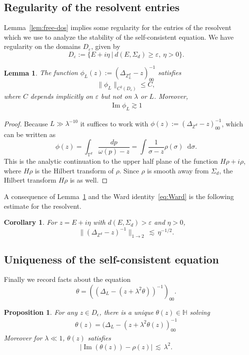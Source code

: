 \documentclass[11pt]{amsart}
\def\bbH{{\mathbb H}}
\def\bbZ{{\mathbb Z}}
\def\Torus{{\mathbb T}}
\def\eps{{\varepsilon}}
\newcommand{\diff}{\mathop{}\!\mathrm{d}}
\newcommand{\Impt}{\operatorname*{Im}}
\def\lsim{{\,\lesssim\,}}
\numberwithin{equation}{section}
\numberwithin{theorem}{section}
\newtheorem{lemma}[theorem]{Lemma}
\newtheorem{corollary}[theorem]{Corollary}
\newtheorem{proposition}[theorem]{Proposition}
\begin{document}
\subsection{Regularity of the resolvent entries}

Lemma~\ref{lem:free-dos} implies some regularity for the entries of the resolvent which we use
to analyze the stability of the self-consistent equation. We have regularity on
the domains $D_\eps$, given by
$$D_{\eps} := \{E+i\eta\ |\ d(E,\Sigma_d)\geq\eps,\ \eta>0 \}.$$
\begin{lemma}
\label{lem:dos-regularity}
The function $\phi_L(z) := (\Delta_{\bbZ^d_L}-z)^{-1}_{00}$ satisfies
\[
\|\phi_L\|_{C^2(D_\eps)} \leq C,
\]
where $C$ depends implicitly on $\eps$ but not on $\lambda$ or $L$.
Moreover,
\begin{align}\label{eq:diagonalResolventLowerBound}
	\Impt\phi_L\gtrsim 1
\end{align}
\end{lemma}
\begin{proof}
Because $L\gg \lambda^{-10}$ it suffices to work with $\phi(z) := (\Delta_{\bbZ^d}-z)^{-1}_{00}$, which can be written as
\[
\phi(z) = \int_{\Torus^d} \frac{dp}{\omega(p)-z}
= \int \frac{1}{\sigma-z} \rho(\sigma)\diff \sigma.
\]
This is the analytic continuation to the upper half plane of the function $H\rho + i\rho$, where
$H\rho$ is the Hilbert transform of $\rho$.  Since $\rho$ is smooth away from $\Sigma_d$,
the Hilbert transform $H\rho$ is as well.
\end{proof}

A consequence of Lemma~\ref{lem:dos-regularity} and the Ward identity~\eqref{eq:Ward} is the following estimate for the resolvent.
\begin{corollary}
\label{cor:free-onetwo}
For $z=E+i\eta$ with $d(E,\Sigma_d)>\eps$ and $\eta>0$,
\[
\|(\Delta_{\bbZ^d} - z)^{-1}\|_{1\to 2} \lsim \eta^{-1/2}.
\]
\end{corollary}

\subsection{Uniqueness of the self-consistent equation}
Finally we record facts about the equation
\[
\theta = ((\Delta_L - (z+\lambda^2\theta))^{-1})_{00}.
\]
\begin{proposition}
\label{pr:thetaAPriori}
For any $z\in D_{\epsilon}$, there is a unique $\theta(z)\in \bbH$ solving
\begin{align*}
\theta(z)=(\Delta_L-(z+\lambda^2\theta(z))^{-1}_{00}
\end{align*}
Moreover for $\lambda \ll 1$, $\theta(z)$ satisfies
\[
|\Impt(\theta(z)) - \rho(z)| \lsim \lambda^2.
\]
\end{proposition}
\end{document}
